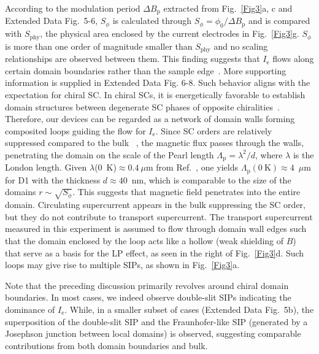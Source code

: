 \documentclass[article,reprint,amsmath,amssymb,superscriptaddress,longbibliography]{revtex4-1}
\begin{document}
According to the modulation period $\Delta B_\textrm{p}$ extracted from Fig.~\ref{Fig3}a, c and Extended Data Fig.~5-6, $S_{\phi}$ is calculated through $S_{\phi}=\phi_0/\Delta B_\textrm{p}$ and is compared with $S_\textrm{phy}$, the physical area enclosed by the current electrodes in Fig.~\ref{Fig3}g. $S_{\phi}$ is more than one order of magnitude smaller than $S_\textrm{phy}$ and no scaling relationships are observed between them. This finding suggests that $I_\textrm{e}$ flows along certain domain boundaries rather than the sample edge~\cite{Ong2020Science}. More supporting information is supplied in Extended Data Fig. 6-8.
Such behavior aligns with the expectation for chiral SC. In chiral SCs, it is energetically favorable to establish domain structures between degenerate SC phases 
of opposite chiralities~\cite{Sigrist1991RMP}. Therefore, our devices can be regarded as a network of domain walls forming composited loops guiding the flow for $I_\textrm{e}$. 
Since SC orders are relatively suppressed compared to the bulk
~\cite{Weitering2023NP}, the magnetic flux passes through the walls, penetrating the domain on the scale of the Pearl length $\Lambda_\textrm{p}=\lambda^2/d$, where $\lambda$ is the London length. Given $\lambda$(0~K)$\approx0.4~\mu$m from Ref.~, one yields $\Lambda_\textrm{p}(0~\textrm{K})\approx4$~$\mu$m for D1 with the thickness $d\approx40$~nm, which is comparable to the size of the domains $r\sim \sqrt{S_\phi}$. This suggests that 
magnetic field penetrates into the entire domain. Circulating supercurrent appears in the bulk suppressing the SC order, but they do not contribute to transport supercurrent.
The transport supercurrent measured in this experiment is assumed to flow through domain wall edges such that the domain enclosed by the loop acts like a hollow (weak shielding of $B$) that serve as a basis for the LP effect, as seen in the right of Fig.~\ref{Fig3}d. Such loops may give rise to multiple SIPs, as shown in Fig.~\ref{Fig3}a.


Note that the preceding discussion primarily revolves around chiral domain boundaries.
In most cases, we indeed observe double-slit SIPs indicating the dominance of $I_\textrm{e}$. 
While, in a smaller subset of cases (Extended Data Fig.~5b),  the superposition of the double-slit SIP and the Fraunhofer-like SIP (generated by a Josephson junction between local domains) is observed, suggesting comparable contributions from both domain boundaries and bulk.
\end{document}
